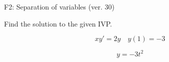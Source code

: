 \begin{exercise}
  \begin{exerciseTitle}F2: Separation of variables (ver. 30)\end{exerciseTitle}
  \begin{exerciseStatement}
    
Find the solution to the given IVP.

    
\[xy'= 2 y \hspace{1em} y( 1 ) = -3\]

  \end{exerciseStatement}
  \begin{exerciseAnswer}
    
\[y= -3 t^ 2\]

  \end{exerciseAnswer}
\end{exercise}